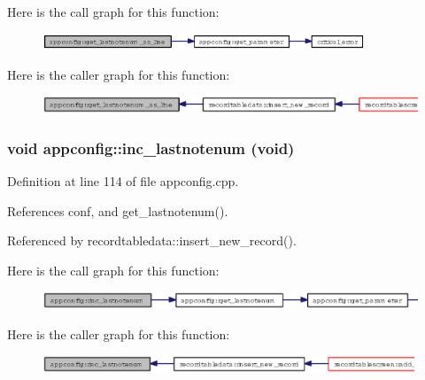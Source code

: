Here is the call graph for this function:\begin{figure}[H]
\begin{center}
\leavevmode
\includegraphics[width=273pt]{classappconfig_2a324f08a97ea456e79d59fe16877000_cgraph}
\end{center}
\end{figure}


Here is the caller graph for this function:\begin{figure}[H]
\begin{center}
\leavevmode
\includegraphics[width=336pt]{classappconfig_2a324f08a97ea456e79d59fe16877000_icgraph}
\end{center}
\end{figure}
\subsubsection{\setlength{\rightskip}{0pt plus 5cm}void appconfig::inc\_\-lastnotenum (void)}\label{classappconfig_1ac40c253c15b60755a4d50b7541abf1}




Definition at line 114 of file appconfig.cpp.

References conf, and get\_\-lastnotenum().

Referenced by recordtabledata::insert\_\-new\_\-record().

Here is the call graph for this function:\begin{figure}[H]
\begin{center}
\leavevmode
\includegraphics[width=350pt]{classappconfig_1ac40c253c15b60755a4d50b7541abf1_cgraph}
\end{center}
\end{figure}


Here is the caller graph for this function:\begin{figure}[H]
\begin{center}
\leavevmode
\includegraphics[width=315pt]{classappconfig_1ac40c253c15b60755a4d50b7541abf1_icgraph}
\end{center}
\end{figure}
